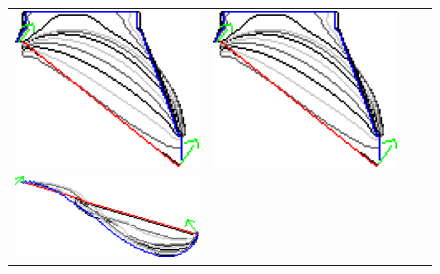 \begin{figure}
\begin{tabular}{cccc}
\includegraphics[scale=0.2]{figures/chapter9/constrained-elastica/graphflow/curve-2/len_pen-0.002/radius-15/N-1/h1.0/summary.pdf} &
\includegraphics[scale=0.25]{figures/chapter9/constrained-elastica/graphflow/curve-2/len_pen-0.0002/radius-15/N-1/h1.0/summary.pdf}\\
\includegraphics[scale=0.2]{figures/chapter9/constrained-elastica/localsearch/curve-3/len_pen-0.002/radius-15/nc-4/h1.0/summary.pdf} &

\end{tabular}
\end{figure}
